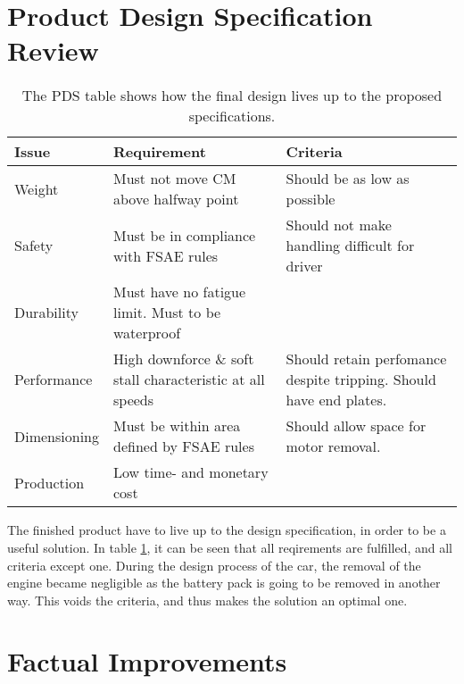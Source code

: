 \section{Product Design Specification Review}

  \begin{table}
    \begin{tabularx}{\textwidth}[t]{>{\columncolor{seapurple!40}}l XX}
      \arrayrulecolor{seapurple}\hline
      \rowcolor{white}
      \textbf{\textcolor{seapurple}{Issue}} & \textbf{\textcolor{seapurple}{Requirement}} & \textbf{\textcolor{seapurple}{Criteria}}\\
      \hline
      Weight & \cellcolor{seagreen!40}Must not move CM above halfway point & \cellcolor{seagreen!40}Should be as low as possible \\
      Safety & \cellcolor{seagreen!40}Must be in compliance with FSAE rules & \cellcolor{seagreen!40}Should not make handling difficult for driver\\
      Durability & \cellcolor{seagreen!40} Must have no fatigue limit. Must to be waterproof \\
      Performance & \cellcolor{seagreen!40} High downforce \& soft stall characteristic at all speeds &\cellcolor{seagreen!40} Should retain perfomance despite tripping. Should have end plates.\\
      Dimensioning & \cellcolor{seagreen!40} Must be within area defined by FSAE rules & \cellcolor{seayellow!40} Should allow space for motor removal. \\
      Production & \cellcolor{seagreen!40} Low time- and monetary cost
    \end{tabularx}
    \caption{The PDS table shows how the final design lives up to the proposed specifications.}
    \label{tab:designreview}
  \end{table}

  The finished product have to live up to the design specification, in order to be a useful solution. In table \ref{tab:designreview}, it can be seen that all reqirements are fulfilled, and all criteria except one. During the design process of the car, the removal of the engine became negligible as the battery pack is going to be removed in another way. This voids the criteria, and thus makes the solution an optimal one.

  \section{Factual Improvements}


